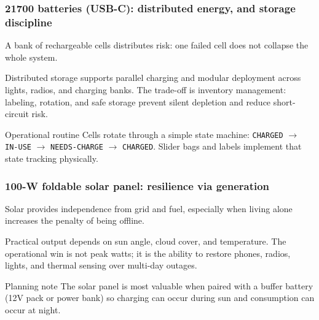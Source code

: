 \begin{frame}[t]
  \frametitle{21700 batteries (USB-C): distributed energy, and storage discipline}
  \justifying
   A bank of rechargeable cells distributes risk: one failed cell does not collapse the whole system.

  \vspace{0.5em}
   Distributed storage supports parallel charging and modular deployment across lights, radios, and charging banks. The trade-off is inventory management: labeling, rotation, and safe storage prevent silent depletion and reduce short-circuit risk.

  \vspace{0.8em}
  \begin{block}{Operational routine}
    Cells rotate through a simple state machine: \texttt{CHARGED} \(\rightarrow\) \texttt{IN-USE} \(\rightarrow\) \texttt{NEEDS-CHARGE} \(\rightarrow\) \texttt{CHARGED}. Slider bags and labels implement that state tracking physically.
  \end{block}
\end{frame}

\begin{frame}[t]
  \frametitle{100-W foldable solar panel: resilience via generation}
  \justifying
   Solar provides independence from grid and fuel, especially when living alone increases the penalty of being offline.

  \vspace{0.5em}
   Practical output depends on sun angle, cloud cover, and temperature. The operational win is not peak watts; it is the ability to restore phones, radios, lights, and thermal sensing over multi-day outages.

  \vspace{0.8em}
  \begin{block}{Planning note}
    The solar panel is most valuable when paired with a buffer battery (12V pack or power bank) so charging can occur during sun and consumption can occur at night.
  \end{block}
\end{frame}

